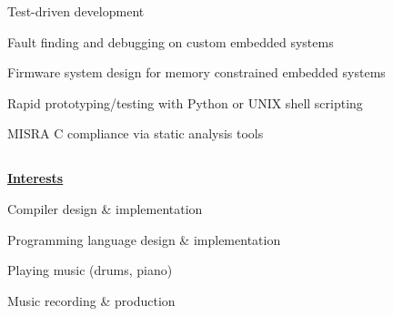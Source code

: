 \documentclass[a4paper,6pt]{article}
\begin{document}
\begin{minipage}{13em}
\noindent
\begin{itemize}
{\small \raggedright
    \item Test-driven development
    \item Fault finding and debugging on custom embedded systems
    \item Firmware system design for memory constrained embedded systems
    \item Rapid prototyping/testing with Python or UNIX shell scripting
    \item MISRA C compliance via static analysis tools
}
\end{itemize}

\subsection*{}
{\underline{\textbf{Interests}}}

\noindent
\begin{itemize}
{\small \raggedright
    \item Compiler design \& implementation
    \item Programming language design \& implementation
    \item Playing music (drums, piano)
    \item Music recording \& production
}
\end{itemize}
\end{minipage}
\hspace*{2em}
%
\end{document}
